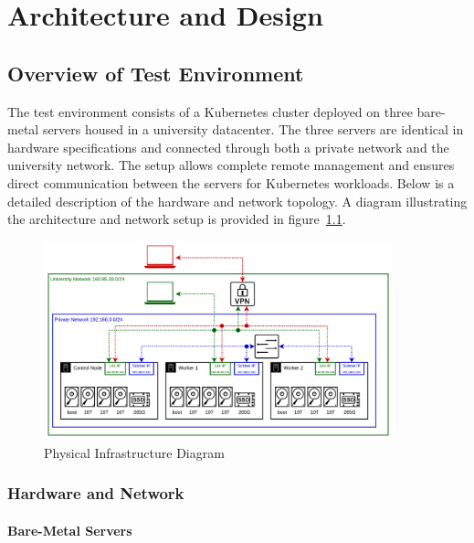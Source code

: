 
\chapter{Architecture and Design} %
\label{Chapter2}

\section{Overview of Test Environment}

The test environment consists of a Kubernetes cluster deployed on three bare-metal servers housed in a university datacenter. The three servers are identical in hardware specifications and connected through both a private network and the university network. The setup allows complete remote management and ensures direct communication between the servers for Kubernetes workloads. Below is a detailed description of the hardware and network topology. A diagram illustrating the architecture and network setup is provided in figure~\ref{fig:physical_and_network_infra}.

\begin{figure}[ht]
    \centering
    \includegraphics[width=0.9\textwidth]{Figures/physical_and_network_infra.png}
    \decoRule
    \caption[Physical Infrastructure Diagram]{Physical Infrastructure Diagram}
    \label{fig:physical_and_network_infra}
    \end{figure}

\subsection{Hardware and Network}

\subsubsection{Bare-Metal Servers}

